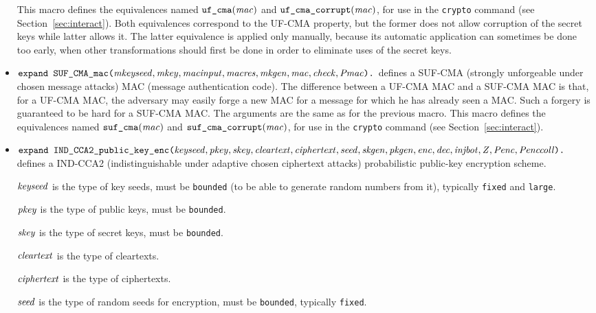 \documentclass{article}
\begin{document}
\begin{itemize}
   This macro defines the equivalences named
   $\texttt{uf\_cma}(\mathit{mac})$ and
   $\texttt{uf\_cma\_corrupt}(\mathit{mac})$, for use in the
   \texttt{crypto} command (see Section~\ref{sec:interact}).
   Both equivalences correspond to the UF-CMA property, but the former 
   does not allow corruption of the secret keys while latter allows it.
   The latter equivalence is applied only manually, because its automatic
   application can sometimes be done too early, when other transformations
   should first be done in order to eliminate uses of the secret keys.

\item $\texttt{expand SUF\_CMA\_mac(}\mathit{mkeyseed}, \mathit{mkey},
  \mathit{macinput}, \mathit{macres}, \mathit{mkgen}, \mathit{mac}, \mathit{check},
  \mathit{Pmac}\texttt{).}$ defines a SUF-CMA (strongly unforgeable under
  chosen message attacks) MAC (message authentication code).  The
  difference between a UF-CMA MAC and a SUF-CMA MAC is that, for a
  UF-CMA MAC, the adversary may easily forge a new MAC for a message
  for which he has already seen a MAC. Such a forgery is guaranteed to
  be hard for a SUF-CMA MAC. The arguments are the same as for the
  previous macro. This macro defines the equivalences named
   $\texttt{suf\_cma}(\mathit{mac})$ and
   $\texttt{suf\_cma\_corrupt}(\mathit{mac})$, for use in the
   \texttt{crypto} command (see Section~\ref{sec:interact}).

\item $\texttt{expand IND\_CCA2\_public\_key\_enc(}\mathit{keyseed}, \mathit{pkey}, \mathit{skey},
  \mathit{cleartext}, \mathit{ciphertext}, \mathit{seed}, \mathit{skgen}, \mathit{pkgen}, \allowbreak \mathit{enc}, \allowbreak
  \mathit{dec}, \allowbreak \mathit{injbot}, \allowbreak \mathit{Z}, \allowbreak \mathit{Penc}, \allowbreak\mathit{Penccoll}\texttt{).}$ defines a
  IND-CCA2 (indistinguishable under adaptive chosen ciphertext attacks)
  probabilistic public-key encryption scheme.

   $\mathit{keyseed}$ is the type of key seeds, must be \texttt{bounded} (to be able to generate random numbers from it), typically \texttt{fixed} and \texttt{large}.

   $\mathit{pkey}$ is the type of public keys, must be \texttt{bounded}.

   $\mathit{skey}$ is the type of secret keys, must be \texttt{bounded}.

   $\mathit{cleartext}$ is the type of cleartexts.

   $\mathit{ciphertext}$ is the type of ciphertexts.

   $\mathit{seed}$ is the type of random seeds for encryption, must be \texttt{bounded}, typically \texttt{fixed}.


\end{itemize}
\end{document}
